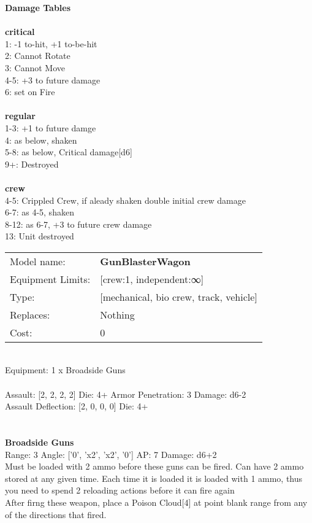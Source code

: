 {\bf Damage Tables} \\
\ \\ {\bf critical } \\
1: -1 to-hit, +1 to-be-hit \\
2: Cannot Rotate \\
3: Cannot Move \\
4-5: +3 to future damage \\
6: set on Fire \\
\ \\ {\bf regular } \\
1-3: +1 to future damge \\
4: as below, shaken \\
5-8: as below, Critical damage[d6] \\
9+: Destroyed \\
\ \\ {\bf crew } \\
4-5: Crippled Crew, if aleady shaken double initial crew damage \\
6-7: as 4-5, shaken \\
8-12: as 6-7, +3 to future crew damage \\
13: Unit destroyed \\


\noindent
\begin{tabular}{ll}
Model name: &{\bf GunBlasterWagon } \\
Equipment Limits: &[crew:1, independent:∞] \\
Type: &[mechanical, bio crew, track, vehicle] \\
Replaces: &Nothing \\
Cost: & 0\\
\end{tabular}
\ \\
Equipment: 1 x Broadside Guns \\
\ \\
Assault: [2, 2, 2, 2] Die: 4+ Armor Penetration: 3 Damage: d6-2 \\
Assault Deflection: [2, 0, 0, 0] Die: 4+\\
\indent  
\ \\

\ \\
{\bf Broadside Guns } \\



Range: 3  Angle: ['0', 'x2', 'x2', '0'] AP: 7 Damage: d6+2 \\
Must be loaded with 2 ammo before these guns can be fired. Can have 2 ammo stored at any given time. Each time it is loaded it is loaded with 1 ammo, thus you need to spend 2 reloading actions before it can fire again\\ 
After firng these weapon, place a Poison Cloud[4] at point blank range from any of the directions that fired.\\ 




